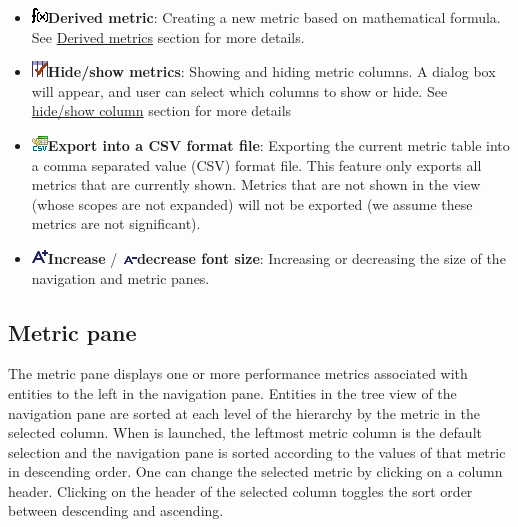 \begin{itemize}
\item
\includegraphics{fig/FnMetric.png}\textbf{Derived metric}: Creating a new metric based on mathematical formula. See \hyperlink{derivedmetrics}{Derived metrics} section for more details.

\item
\includegraphics{fig/checkColumns.png}\textbf{Hide/show metrics}: Showing and hiding metric columns. A dialog box will appear, and user can select which columns to show or hide. See \hyperlink{hideshowcolumn}{hide/show column} section for more details

\item
\includegraphics{fig/savecsv.png}\textbf{Export into a CSV format file}: Exporting the current metric table into a comma separated value (CSV) format file. This feature only exports all metrics that are currently shown. Metrics that are not shown in the view (whose scopes are not expanded) will not be exported (we assume these metrics are not significant).

\item
\includegraphics{fig/FontBigger.png}\textbf{Increase} /
\includegraphics{fig/FontSmaller.png}\textbf{decrease font size}: Increasing or decreasing the size of the navigation and metric panes.
\end{itemize}


\subsection{Metric pane} The metric pane displays one or more performance metrics associated with entities to the left in the navigation pane. Entities in the tree view of the navigation pane are sorted at each level of the hierarchy by the metric in the selected column. When \hpcviewer{} is launched, the leftmost metric column is the default selection and the navigation pane is sorted according to the values of that metric in descending order. One can change the selected metric by clicking on a column header. Clicking on the header of the selected column toggles the sort order between descending and ascending.

